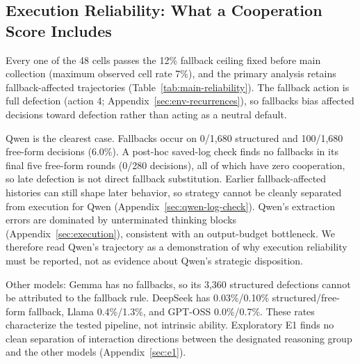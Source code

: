 \documentclass[11pt]{article}
\begin{document}
\subsection{Execution Reliability: What a Cooperation Score Includes}
\label{sec:reliability}
Every one of the 48 cells passes the 12\% fallback ceiling fixed before main collection (maximum observed cell rate 7\%), and the primary analysis retains fallback-affected trajectories (Table~\ref{tab:main-reliability}). The fallback action is full defection (action 4; Appendix~\ref{sec:env-recurrences}), so fallbacks bias affected decisions toward defection rather than acting as a neutral default.

Qwen is the clearest case. Fallbacks occur on 0/1{,}680 structured and 100/1{,}680 free-form decisions (6.0\%). A post-hoc saved-log check finds no fallbacks in its final five free-form rounds (0/280 decisions), all of which have zero cooperation, so late defection is not direct fallback substitution. Earlier fallback-affected histories can still shape later behavior, so strategy cannot be cleanly separated from execution for Qwen (Appendix~\ref{sec:qwen-log-check}). Qwen's extraction errors are dominated by unterminated thinking blocks (Appendix~\ref{sec:execution}), consistent with an output-budget bottleneck. We therefore read Qwen's trajectory as a demonstration of why execution reliability must be reported, not as evidence about Qwen's strategic disposition.

Other models: Gemma has no fallbacks, so its 3{,}360 structured defections cannot be attributed to the fallback rule. DeepSeek has 0.03\%/0.10\% structured/free-form fallback, Llama 0.4\%/1.3\%, and GPT-OSS 0.0\%/0.7\%. These rates characterize the tested pipeline, not intrinsic ability. Exploratory E1 finds no clean separation of interaction directions between the designated reasoning group and the other models (Appendix~\ref{sec:e1}).
\end{document}
